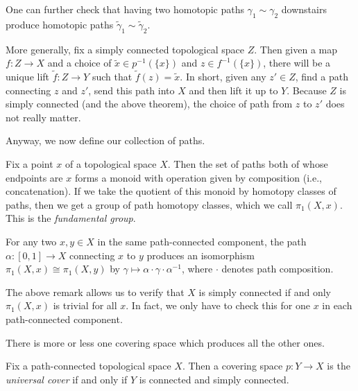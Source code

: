 \documentclass[../notes.tex]{subfiles}
\begin{document}
\begin{remark}
	One can further check that having two homotopic paths $\gamma_1\sim\gamma_2$ downstairs produce homotopic paths $\widetilde\gamma_1\sim\widetilde\gamma_2$. 
\end{remark}
\begin{remark}
	More generally, fix a simply connected topological space $Z$. Then given a map $f\colon Z\to X$ and a choice of $\widetilde x\in p^{-1}(\{x\})$ and $z\in f^{-1}(\{x\})$, there will be a unique lift $\widetilde f\colon Z\to Y$ such that $\widetilde f(z)=\widetilde x$. In short, given any $z'\in Z$, find a path connecting $z$ and $z'$, send this path into $X$ and then lift it up to $Y$. Because $Z$ is simply connected (and the above theorem), the choice of path from $z$ to $z'$ does not really matter.
\end{remark}
Anyway, we now define our collection of paths.
\begin{definition}
	Fix a point $x$ of a topological space $X$. Then the set of paths both of whose endpoints are $x$ forms a monoid with operation given by composition (i.e., concatenation). If we take the quotient of this monoid by homotopy classes of paths, then we get a group of path homotopy classes, which we call $\pi_1(X,x)$. This is the \textit{fundamental group}.
\end{definition}
\begin{remark}
	For any two $x,y\in X$ in the same path-connected component, the path $\alpha\colon[0,1]\to X$ connecting $x$ to $y$ produces an isomorphism $\pi_1(X,x)\cong\pi_1(X,y)$ by $\gamma\mapsto\alpha\cdot\gamma\cdot\alpha^{-1}$, where $\cdot$ denotes path composition.
\end{remark}
\begin{remark}
	The above remark allows us to verify that $X$ is simply connected if and only $\pi_1(X,x)$ is trivial for all $x$. In fact, we only have to check this for one $x$ in each path-connected component.
\end{remark}
There is more or less one covering space which produces all the other ones.
\begin{definition}
	Fix a path-connected topological space $X$. Then a covering space $p\colon Y\to X$ is the \textit{universal cover} if and only if $Y$ is connected and simply connected.
\end{definition}
\end{document}
